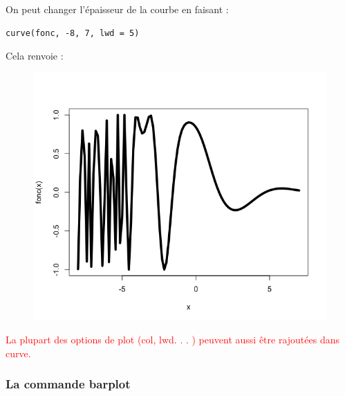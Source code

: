 On peut changer l'épaisseur de la courbe en faisant :
\begin{lstlisting}[language=html]
curve(fonc, -8, 7, lwd = 5)
\end{lstlisting}
Cela renvoie :
\begin{figure}[H]\begin{center}\includegraphics[scale=0.4]{ilu/gra29.png}\end{center}\end{figure}
\textcolor{red}{La plupart des options de plot (col, lwd. . . ) peuvent aussi être rajoutées dans curve.}
\subsubsection{La commande barplot}
